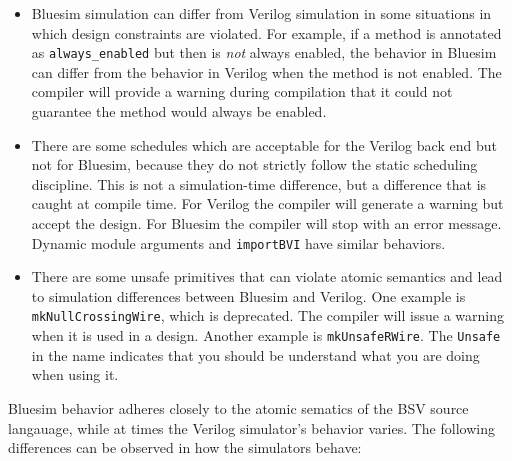 \documentclass{article}
\newcommand{\te}[1]{\texttt{#1}}
\begin{document}
\begin{itemize}
\item Bluesim simulation can differ from Verilog simulation in some
situations in which design constraints are violated.  For example, if
a method is annotated as \te{always\_enabled} but then is {\em not}
always enabled, the behavior in Bluesim can differ from the behavior
in Verilog when the method is not enabled.  The compiler will provide
a warning during compilation that it could not guarantee the method
would  always be enabled.

\item  There are some schedules which are acceptable for the Verilog
back end but not for Bluesim, because they do not strictly follow the
static scheduling discipline.  This is not a simulation-time
difference, but a difference that is caught at compile time.  For
Verilog the compiler will generate a warning but accept the design.
For Bluesim the compiler will stop with an error message.  Dynamic
module arguments and \te{importBVI} have similar behaviors.

\item There are some unsafe primitives that can violate atomic
semantics and lead to simulation differences between Bluesim and
Verilog.  One example is \te{mkNullCrossingWire}, which is deprecated.
 The compiler will issue a warning when it is used in a design.
Another example is \te{mkUnsafeRWire}. The \te{Unsafe} in the name
indicates that you should be understand what you are doing when using it.

\end{itemize}

Bluesim behavior adheres closely to the atomic sematics of the BSV
source langauage, while at times the Verilog simulator's behavior
varies.  The following differences can be observed in how the
simulators behave:
\end{document}
